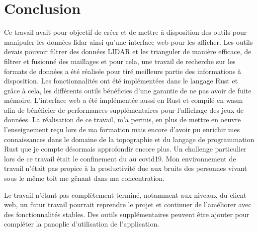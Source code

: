 \chapter*{Conclusion}

Ce travail avait pour objectif de créer et de mettre à disposition des outils pour manipuler les données \gls{lidar} ainsi qu'une interface web pour les afficher.
Les outils devais pouvoir filtrer des données LIDAR et les trianguler de manière efficace, de filtrer et fusionné des maillages et pour cela, une travail de recherche sur les formats de données a été réalisée pour tiré meilleurs partie des informations à disposition.
Les fonctionnalités ont été implémentées dans le langage Rust et grâce à cela, les différents outils bénéficies d'une garantie de ne pas avoir de fuite mémoire.
L'interface web a été implémentée aussi en Rust et compilé en \gls{wasm} afin de bénéficier de performances supplémentaires pour l'affichage des jeux de données. 
La réalisation de ce travail, m'a permis, en plus de mettre en oeuvre l'enseignement reçu lors de ma formation mais encore d'avoir pu enrichir mes connaissances dans le domaine de la topographie et du langage de programmation Rust que je compte désormais approfondir encore plus. Un challenge particulier lors de ce travail était le confinement du au covid19. Mon environnement de travail n'était pas propice à la productivité due aux bruits des personnes vivant sous le même toit me gênant dans ma concentration.

Le travail n'étant pas complètement terminé, notamment aux niveaux du client web, un futur travail pourrait reprendre le projet et continuer de l'améliorer avec des fonctionnalités stables. Des outils supplémentaires peuvent être ajouter pour compléter la panoplie d'utilisation de l'application.